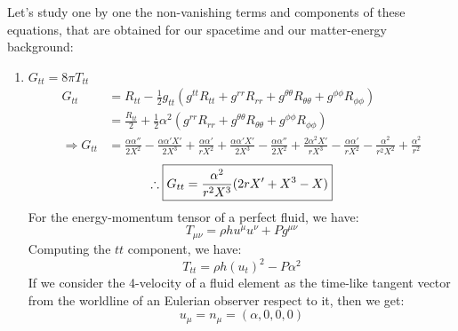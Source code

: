 \documentclass[12pt]{report}
\begin{document}
	Let's study one by one the non-vanishing terms and components of these equations, that are obtained for our spacetime and our matter-energy background:
	\begin{enumerate}
		\item $G_{tt} = 8\pi T_{tt}$
		\begin{align*}
			G_{tt} &= R_{tt}-\frac{1}{2}g_{tt}(g^{tt}R_{tt} + g^{rr}R_{rr} + g^{\theta\theta}R_{\theta\theta} + g^{\phi\phi}R_{\phi\phi})\\
			&= \frac{R_{tt}}{2} + \frac{1}{2}\alpha^2(g^{rr}R_{rr} + g^{\theta\theta}R_{\theta\theta} + g^{\phi\phi}R_{\phi\phi})\\
			\Rightarrow G_{tt}&= \frac{\alpha\alpha''}{2X^2} - \frac{\alpha\alpha'X'}{2X^3} + \frac{\alpha\alpha'}{rX^2} + \frac{\alpha\alpha'X'}{2X^3} - \frac{\alpha\alpha''}{2X^2} + \frac{2\alpha^2X'}{rX^3} - \frac{\alpha\alpha'}{rX^2} - \frac{\alpha^2}{r^2X^2} + \frac{\alpha^2}{r^2}
		\end{align*}
		\begin{equation}
			\therefore \boxed{ G_{tt} = \frac{\alpha^2}{r^2X^3}(2rX' + X^3 - X)}\\
		\end{equation}
		For the energy-momentum tensor of a perfect fluid, we have:
		\begin{equation}
			T_{\mu\nu} = \rho h u^\mu u^\nu + Pg^{\mu\nu} 
		\end{equation}
		Computing the $tt$ component, we have:
		\begin{equation}
			T_{tt} = \rho h(u_t)^2 - P\alpha^2
		\end{equation}
		If we consider the 4-velocity of a fluid element as the time-like tangent vector from the worldline of an Eulerian observer respect to it, then we get:
		\begin{equation}
			u_\mu = n_\mu = (\alpha, 0, 0, 0)
		\end{equation}
		

\end{enumerate}
\end{document}
